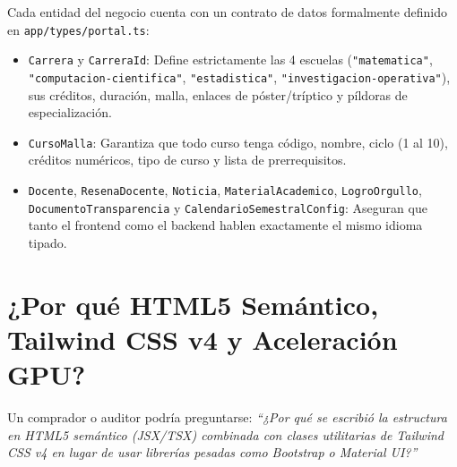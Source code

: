 \documentclass[12pt,a4paper,oneside]{report}
\begin{document}
Cada entidad del negocio cuenta con un contrato de datos formalmente definido en \texttt{app/types/portal.ts}:
\begin{itemize}[leftmargin=1.0cm]
  \item \texttt{Carrera} y \texttt{CarreraId}: Define estrictamente las 4 escuelas (\texttt{"matematica"}, \texttt{"computacion-cientifica"}, \texttt{"estadistica"}, \texttt{"investigacion-operativa"}), sus créditos, duración, malla, enlaces de póster/tríptico y píldoras de especialización.
  \item \texttt{CursoMalla}: Garantiza que todo curso tenga código, nombre, ciclo (1 al 10), créditos numéricos, tipo de curso y lista de prerrequisitos.
  \item \texttt{Docente}, \texttt{ResenaDocente}, \texttt{Noticia}, \texttt{MaterialAcademico}, \texttt{LogroOrgullo}, \texttt{DocumentoTransparencia} y \texttt{CalendarioSemestralConfig}: Aseguran que tanto el frontend como el backend hablen exactamente el mismo idioma tipado.
\end{itemize}

\section{¿Por qué HTML5 Semántico, Tailwind CSS v4 y Aceleración GPU?}
Un comprador o auditor podría preguntarse: \textit{``¿Por qué se escribió la estructura en HTML5 semántico (JSX/TSX) combinada con clases utilitarias de Tailwind CSS v4 en lugar de usar librerías pesadas como Bootstrap o Material UI?''}
\end{document}
